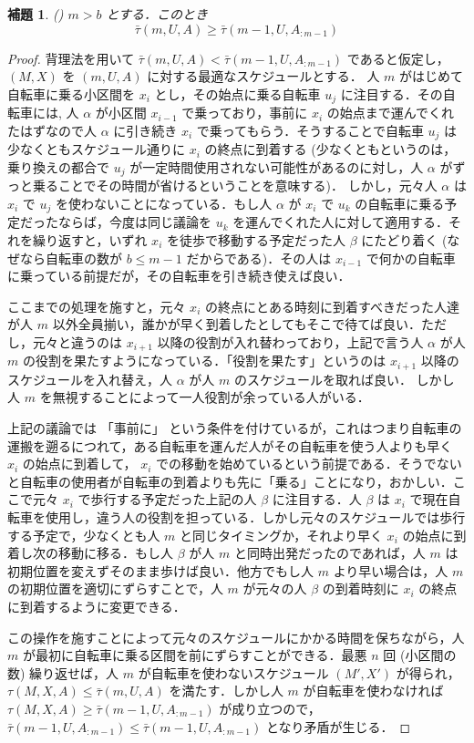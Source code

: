 \documentclass[11pt,a4paper]{jarticle}
\newtheorem{lemma}{補題}
\begin{document}
\begin{lemma}\label{lemma:fsabs-lower-bound-recursive}
  ({\color{red}{補題 or 定理？}}) $m > b$ とする．このとき
  \begin{equation}
    \bar\tau(m, U, A) \geq \bar\tau(m - 1, U, A_{:m-1})
  \end{equation}
\end{lemma}
\begin{proof}
  背理法を用いて $\bar\tau(m, U, A) < \bar\tau(m - 1, U, A_{:m-1})$ であると仮定し，$(M, X)$ を $(m, U, A)$ に対する最適なスケジュールとする．
  人 $m$ がはじめて自転車に乗る小区間を $x_i$ とし，その始点に乗る自転車 $u_j$ に注目する．その自転車には,
  人 $\alpha$ が小区間 $x_{i - 1}$ で乗っており，事前に $x_i$ の始点まで運んでくれたはずなので人 $\alpha$ に引き続き $x_i$ で乗ってもらう．そうすることで自転車 $u_j$ は少なくともスケジュール通りに $x_i$ の終点に到着する (少なくともというのは，乗り換えの都合で $u_j$ が一定時間使用されない可能性があるのに対し，人 $\alpha$ がずっと乗ることでその時間が省けるということを意味する)． しかし，元々人 $\alpha$ は $x_i$ で $u_j$ を使わないことになっている．もし人 $\alpha$ が $x_i$ で $u_k$ の自転車に乗る予定だったならば，今度は同じ議論を $u_k$ を運んでくれた人に対して適用する．それを繰り返すと，いずれ $x_i$ を徒歩で移動する予定だった人 $\beta$ にたどり着く (なぜなら自転車の数が $b \leq m - 1$ だからである)．その人は $x_{i - 1}$ で何かの自転車に乗っている前提だが，その自転車を引き続き使えば良い．

ここまでの処理を施すと，元々 $x_i$ の終点にとある時刻に到着すべきだった人達が人 $m$ 以外全員揃い，誰かが早く到着したとしてもそこで待てば良い．ただし，元々と違うのは $x_{i + 1}$ 以降の役割が入れ替わっており，上記で言う人 $\alpha$ が人 $m$ の役割を果たすようになっている．「役割を果たす」というのは $x_{i + 1}$ 以降のスケジュールを入れ替え，人 $\alpha$ が人 $m$ のスケジュールを取れば良い． しかし人 $m$ を無視することによって一人役割が余っている人がいる．

上記の議論では 「事前に」 という条件を付けているが，これはつまり自転車の運搬を遡るにつれて，ある自転車を運んだ人がその自転車を使う人よりも早く $x_i$ の始点に到着して， $x_i$ での移動を始めているという前提である．そうでないと自転車の使用者が自転車の到着よりも先に「乗る」ことになり，おかしい．ここで元々 $x_i$ で歩行する予定だった上記の人 $\beta$ に注目する．人 $\beta$ は $x_i$ で現在自転車を使用し，違う人の役割を担っている．しかし元々のスケジュールでは歩行する予定で，少なくとも人 $m$ と同じタイミングか，それより早く $x_i$ の始点に到着し次の移動に移る．もし人 $\beta$ が人 $m$ と同時出発だったのであれば，人 $m$ は初期位置を変えずそのまま歩けば良い．他方でもし人 $m$ より早い場合は，人 $m$ の初期位置を適切にずらすことで，人 $m$ が元々の人 $\beta$ の到着時刻に $x_i$ の終点に到着するように変更できる．

この操作を施すことによって元々のスケジュールにかかる時間を保ちながら，人 $m$ が最初に自転車に乗る区間を前にずらすことができる．最悪 $n$ 回 (小区間の数) 繰り返せば，人 $m$ が自転車を使わないスケジュール $(M\prime, X\prime)$ が得られ， $\tau(M, X, A) \leq \bar\tau(m, U, A)$ を満たす．しかし人 $m$ が自転車を使わなければ $\tau(M, X, A) \geq \bar\tau(m - 1, U, A_{:m-1})$ が成り立つので， $\bar\tau(m - 1, U, A_{:m-1}) \leq \bar\tau(m - 1, U,A_{:m-1})$ となり矛盾が生じる．
\end{proof}
\end{document}

